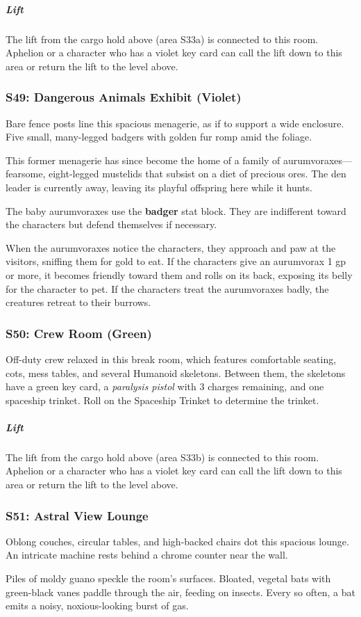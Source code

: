 \documentclass[10pt,a4paper,twoside,bg=print,twocolumn,openany,nodeprecatedcode]{dndbook}
\begin{document}
\subparagraph{Lift}
The lift from the cargo hold above (area S33a) is connected to this room. Aphelion or a character who has a violet key card can call the lift down to this area or return the lift to the level above.

\subsubsection{S49: Dangerous Animals Exhibit (Violet)}
\begin{DndReadAloud}{}
Bare fence posts line this spacious menagerie, as if to support a wide enclosure. Five small, many-legged badgers with golden fur romp amid the foliage.

\end{DndReadAloud}

This former menagerie has since become the home of a family of aurumvoraxes—fearsome, eight-legged mustelids that subsist on a diet of precious ores. The den leader is currently away, leaving its playful offspring here while it hunts.

The baby aurumvoraxes use the \textbf{badger} stat block. They are indifferent toward the characters but defend themselves if necessary.

When the aurumvoraxes notice the characters, they approach and paw at the visitors, sniffing them for gold to eat. If the characters give an aurumvorax 1 gp or more, it becomes friendly toward them and rolls on its back, exposing its belly for the character to pet. If the characters treat the aurumvoraxes badly, the creatures retreat to their burrows.

\subsubsection{S50: Crew Room (Green)}
Off-duty crew relaxed in this break room, which features comfortable seating, cots, mess tables, and several Humanoid skeletons. Between them, the skeletons have a green key card, a \textit{paralysis pistol} with 3 charges remaining, and one spaceship trinket. Roll on the Spaceship Trinket to determine the trinket.

\subparagraph{Lift}
The lift from the cargo hold above (area S33b) is connected to this room. Aphelion or a character who has a violet key card can call the lift down to this area or return the lift to the level above.

\subsubsection{S51: Astral View Lounge}
\begin{DndReadAloud}{}
Oblong couches, circular tables, and high-backed chairs dot this spacious lounge. An intricate machine rests behind a chrome counter near the wall.

Piles of moldy guano speckle the room's surfaces. Bloated, vegetal bats with green-black vanes paddle through the air, feeding on insects. Every so often, a bat emits a noisy, noxious-looking burst of gas.

\end{DndReadAloud}
\end{document}
